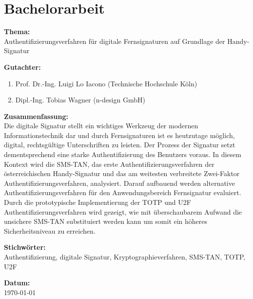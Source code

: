 \chapter*{Bachelorarbeit}
\textbf{Thema:} \\
Authentifizierungsverfahren für digitale Fernsignaturen auf Grundlage der Handy-Signatur

\vspace{0.5cm}

\textbf{Gutachter:}
\begin{enumerate}
    \item Prof. Dr.-Ing. Luigi Lo Iacono (Technische Hochschule Köln)
    \item Dipl.-Ing. Tobias Wagner (n-design GmbH)
\end{enumerate}

\vspace{0.5cm}

\textbf{Zusammenfassung:} \\
Die digitale Signatur stellt ein wichtiges Werkzeug der modernen Informationstechnik dar und durch Fernsignaturen ist es heutzutage möglich, digital, rechtsgültige Unterschriften zu leisten. Der Prozess der Signatur setzt dementsprechend eine starke Authentifizierung des Benutzers voraus. In diesem Kontext wird die SMS-TAN, das erste Authentifizierungsverfahren der österreichischen Handy-Signatur und das am weitesten verbreitete Zwei-Faktor Authentifizierungsverfahren, analysiert. Darauf aufbauend werden alternative Authentifizierungsverfahren für den Anwendungsbereich Fernsignatur evaluiert. Durch die prototypische Implementierung der TOTP und U2F Authentifizierungsverfahren wird gezeigt, wie mit überschaubarem Aufwand die unsichere SMS-TAN substituiert werden kann um somit ein höheres Sicherheitsniveau zu erreichen.

\vspace{0.5cm}

\textbf{Stichwörter:} \\
Authentifizierung, digitale Signatur, Kryptographieverfahren, SMS-TAN, TOTP, U2F

\vspace{0.5cm}

\textbf{Datum:} \\
\today

\clearpage

